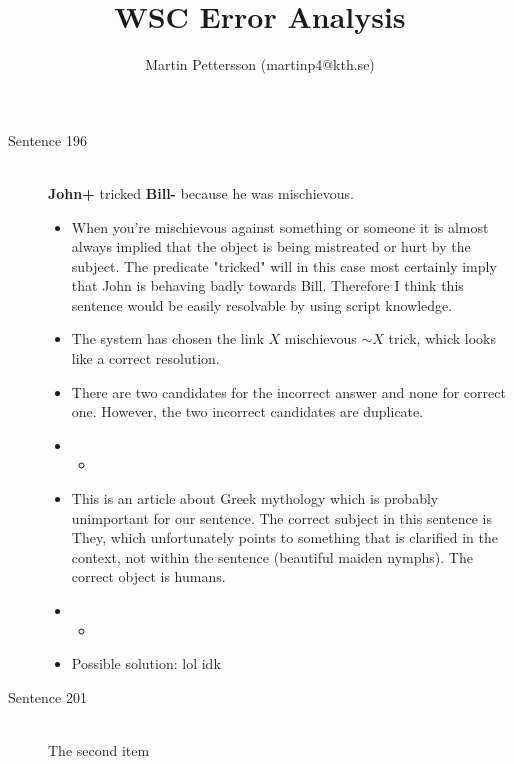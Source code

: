 \documentclass{article}
\newcommand{\insertcode}[2]{\begin{itemize}\item[]\end{itemize}} %
\begin{document}
\title{WSC Error Analysis}
\author{Martin Pettersson (martinp4@kth.se)}
\maketitle

\begin{description}
  \item[Sentence 196] \hfill \\
  {\bf John+} tricked {\bf Bill-} because he was mischievous.
  \begin{itemize}
  	\item When you're mischievous against something or someone it is almost always implied that the object is being mistreated or hurt by the subject. The predicate "tricked" will in this case most certainly imply that John is behaving badly towards Bill. Therefore I think this sentence would be easily resolvable by using script knowledge.
  	\item The system has chosen the link $X$ mischievous $ \sim X $ trick, whick looks like a correct resolution.
  	\item There are two candidates for the incorrect answer and none for correct one. However, the two incorrect candidates are duplicate.
  	\item \insertcode{"Scripts/196/196-1.sentence"}{Context for $R_1$ and $R_2$ (duplicates).}
  	\item This is an article about Greek mythology which is probably unimportant for our sentence. The correct subject in this sentence is They, which unfortunately points to something that is clarified in the context, not within the sentence (beautiful maiden nymphs). The correct object is humans. 
  	\item \insertcode{"Scripts/196/196-2.sentence"}{Target sentence in $R_1$ and $R_2$.}
  	\item Possible solution: lol idk
  \end{itemize}
  \item[Sentence 201] \hfill \\
  The second item
\end{description}

\end{document}
